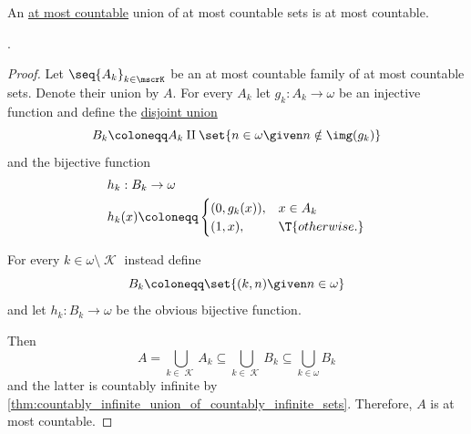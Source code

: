 \begin{corollary}\label{thm:at_most_countable_union_of_at_most_countable_sets}
  An \hyperref[def:aleph_zero_related_cardinalities]{at most countable} union of at most countable sets is at most countable.
\end{corollary}
\begin{comments}
  \item {}.
\end{comments}
\begin{proof}
  Let \( \seq{ A_k }_{k \in \mscrK} \) be an at most countable family of at most countable sets. Denote their union by \( A \). For every \( A_k \) let \( g_k: A_k \to \omega \) be an injective function and define the \hyperref[def:disjoint_union]{disjoint union}
  \begin{equation*}
    B_k \coloneqq A_k \amalg \set{ n \in \omega \given n \notin \img(g_k) }
  \end{equation*}
  and the bijective function
  \begin{equation*}
    \begin{aligned}
      &h_k: B_k \to \omega \\
      &h_k(x) \coloneqq \begin{cases}
        (0, g_k(x)), &x \in A_k \\
        (1, x),      &\T{otherwise.}
      \end{cases}
    \end{aligned}
  \end{equation*}

  For every \( k \in \omega \setminus \mscrK \) instead define
  \begin{equation*}
    B_k \coloneqq \set{ (k, n) \given n \in \omega }
  \end{equation*}
  and let \( h_k: B_k \to \omega \) be the obvious bijective function.

  Then
  \begin{equation*}
    A
    =
    \bigcup_{k \in \mscrK} A_k
    \subseteq
    \bigcup_{k \in \mscrK} B_k
    \subseteq
    \bigcup_{k \in \omega} B_k
  \end{equation*}
  and the latter is countably infinite by \cref{thm:countably_infinite_union_of_countably_infinite_sets}. Therefore, \( A \) is at most countable.
\end{proof}
